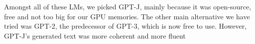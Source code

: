 Amongst all of these LMs, we picked GPT-J, mainly because it was open-source, free and not too big for our GPU memories. The other main alternative we have tried was GPT-2\cite{radford2019language}, the predecessor of GPT-3, which is now free to use. However, GPT-J's generated text was more coherent and more fluent \\



